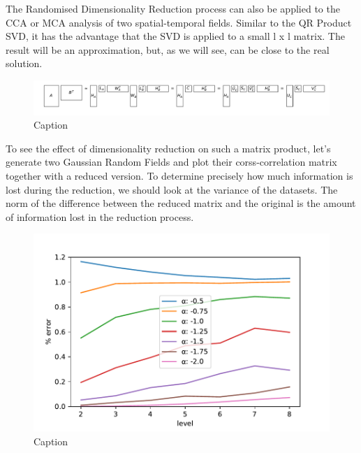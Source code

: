 \documentclass{acm_proc_article-sp}
\begin{document}
The Randomised Dimensionality Reduction process can also be applied to the CCA or MCA analysis of two spatial-temporal fields. Similar to the QR Product SVD, it has the advantage that the SVD is applied to a small l x l matrix. The result will be an approximation, but, as we will see, can be close to the real solution.

\begin{figure}[h]
\begin{center}
\includegraphics[scale=0.22]{Results/randomisedSquareProductSVD.pdf}
\caption[Small caption]{Caption}
\label{fig:randomisedSquareProductSVD}
\end{center}
\end{figure}

To see the effect of dimensionality reduction on such a matrix product, let's generate two Gaussian Random Fields and plot their corss-correlation matrix together with a reduced version. To determine precisely how much information is lost during the reduction, we should look at the variance of the datasets. The norm of the difference between the reduced matrix and the original is the amount of information lost in the reduction process.

\begin{figure}[h]
\begin{center}
\includegraphics[scale=0.5]{Results/plotRandomisedSizeReducedMatrixProduct.pdf}
\caption[Small caption]{Caption}
\label{fig:plotRandomisedSizeReducedMatrixProduct}
\end{center}
\end{figure}
\end{document}
